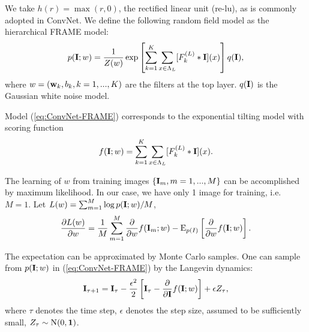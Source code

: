 \documentclass[11pt]{article}
\def\E{{\rm E}}
\def\I{{\bf I}}
\def\w{{\bf w}}
\begin{document}
We take $h(r) = \max(r, 0)$, the rectified linear unit (re-lu), as is commonly adopted in ConvNet. We define the following random field model as the hierarchical FRAME model:
\begin{equation}
p(\I; w) = \frac{1}{Z(w)} \exp \left[\sum_{k=1}^{K} \sum_{x \in \Lambda_L} [F_k^{(L)}*\I](x)\right] q(\I), 
\label{eq:ConvNet-FRAME}
\end{equation}
where  $w = (\w_k, b_k, k = 1, ..., K)$ are the filters at the top layer.  $q(\I)$ is the Gaussian white noise model.


 
Model (\ref{eq:ConvNet-FRAME})  corresponds to the exponential tilting model with scoring function
\begin{equation}
f(\I; w) = \sum_{k=1}^{K} \sum_{x \in \Lambda_L} [F_k^{(L)}*\I](x). \label{eq:a}
\end{equation}

The learning of $w$ from training images $\{\I_m, m = 1, ..., M\}$  can be accomplished by maximum likelihood. In our case, we have only 1 image for training, i.e. $M=1$.
 Let $L(w) = \sum_{m=1}^{M} \log p(\I; w)/M$, 
\begin{equation}
	\frac{\partial L(w)}{\partial w} = \frac{1}{M} \sum_{m=1}^{M} \frac{\partial}{\partial w} f(\I_m; w) 
	-  \E_{p(I)} \left[ \frac{\partial}{\partial w} f(\I; w) \right].
\label{eq:grad}
\end{equation}


The expectation can be approximated by Monte Carlo samples. One can sample from $p(\I; w)$ in (\ref{eq:ConvNet-FRAME}) by the Langevin dynamics: 
\begin{equation}
\I_{\tau+1} = \I_{\tau} - \frac{\epsilon^2}{2} \left[\I_\tau - \frac{\partial}{\partial \I}f(\I; w) \right] + \epsilon Z_\tau,
\end{equation}
where $\tau$ denotes the time step, $\epsilon$ denotes the step size, assumed to be sufficiently small, $Z_\tau \sim {\rm N}(0, {\bf 1})$.
\end{document}
